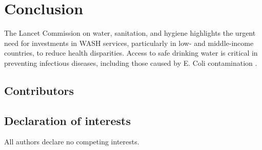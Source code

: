 \documentclass [11pt]{article}
\theoremstyle{plain}
\theoremstyle{definition}
\theoremstyle{remark}
\newcommand{\1}{\bm{1}}
\begin{document}

\section{Conclusion}  

The Lancet Commission on water, sanitation, and hygiene highlights the urgent need for investments in WASH services, particularly in low- and middle-income countries, to reduce health disparities. Access to safe drinking water is critical in preventing infectious diseases, including those caused by E. Coli contamination \cite{lancet2021commission}. 


\subsection*{Contributors}  

\subsection*{Declaration of interests}  
All authors declare no competing interests.
\end{document}

